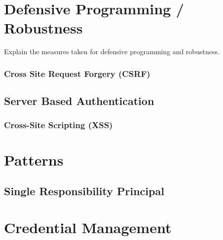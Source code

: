\section{Defensive Programming / Robustness}
Explain the measures taken for defensive programming and robustness.


\subsubsection{Cross Site Request Forgery (CSRF)}

\subsection{Server Based Authentication}
\subsubsection{Cross-Site Scripting (XSS)}


\section{Patterns}
\subsection{Single Responsibility Principal}


\section{Credential Management}